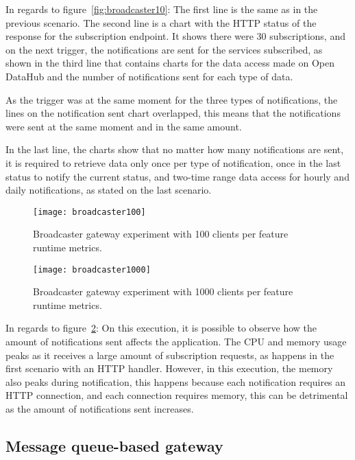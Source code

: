 In regards to figure~\ref{fig:broadcaster10}: The first line is the same as in the previous scenario. The second line is a chart with the HTTP status of the response for the subscription endpoint. It shows there were 30 subscriptions, and on the next trigger, the notifications are sent for the services subscribed, as shown in the third line that contains charts for the data access made on Open DataHub and the number of notifications sent for each type of data.

As the trigger was at the same moment for the three types of notifications, the lines on the notification sent chart overlapped, this means that the notifications were sent at the same moment and in the same amount.

In the last line, the charts show that no matter how many notifications are sent, it is required to retrieve data only once per type of notification, once in the last status to notify the current status, and two-time range data access for hourly and daily notifications, as stated on the last scenario.

\begin{figure}
    \centering
    \texttt{[image: broadcaster100]}
    \caption{Broadcaster gateway experiment with 100 clients per feature runtime metrics.\label{fig:broadcaster100}}
\end{figure}

\begin{figure}
    \centering
    \texttt{[image: broadcaster1000]}
    \caption{Broadcaster gateway experiment with 1000 clients per feature runtime metrics.\label{fig:broadcaster1000}}
\end{figure}

In regards to figure~\ref{fig:broadcaster1000}: On this execution, it is possible to observe how the amount of notifications sent affects the application. The CPU and memory usage peaks as it receives a large amount of subscription requests, as happens in the first scenario with an HTTP handler. However, in this execution, the memory also peaks during notification, this happens because each notification requires an HTTP connection, and each connection requires memory, this can be detrimental as the amount of notifications sent increases.

\subsection*{Message queue-based gateway}
\label{sec:messageresult}

